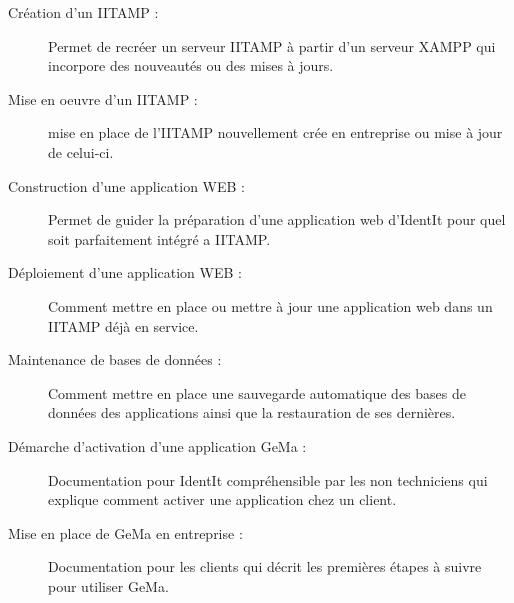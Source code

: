 \begin{description}
  \item[Création d'un IITAMP :] Permet de recréer un serveur IITAMP à partir
  d'un serveur XAMPP qui incorpore des nouveautés ou des mises à jours.

  \item[Mise en oeuvre d'un IITAMP :] mise en place de l'IITAMP nouvellement
  crée en entreprise ou mise à jour de celui-ci.

  \item[Construction d'une application WEB :] Permet de guider la préparation d'une
  application web d'IdentIt pour quel soit parfaitement intégré a IITAMP.

  \item[Déploiement d'une application WEB :] Comment mettre en place ou mettre
  à jour une application web dans un IITAMP déjà en service.

  \item[Maintenance de bases de données :] Comment mettre en place une sauvegarde
  automatique des bases de données des applications ainsi que la
  restauration de ses dernières.

  \item[Démarche d'activation d'une application GeMa :] Documentation pour
  IdentIt compréhensible par les non techniciens qui explique comment
  activer une application chez un client.

  \item[Mise en place de GeMa en entreprise :] Documentation pour les clients qui
  décrit les premières étapes à suivre pour utiliser GeMa.
\end{description}
